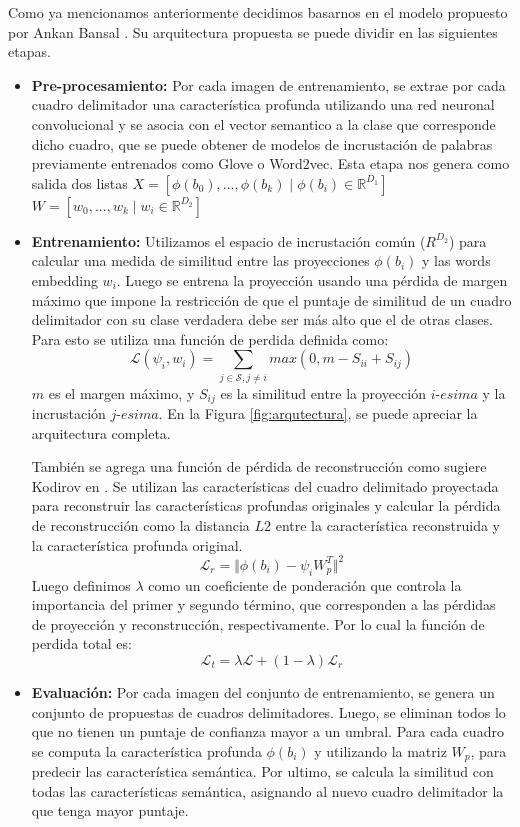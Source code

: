 Como ya mencionamos anteriormente decidimos basarnos en el modelo propuesto por Ankan Bansal \cite{bansal2018zero}. Su arquitectura propuesta se puede dividir en las siguientes etapas.
\begin{itemize}
	\item \textbf{Pre-procesamiento:} Por cada imagen de entrenamiento, se extrae por cada cuadro delimitador una característica profunda utilizando una red neuronal convolucional y se asocia con el vector semantico a la clase que corresponde dicho cuadro, que se puede obtener de modelos de incrustación de palabras previamente entrenados como Glove o Word2vec. Esta etapa nos genera como salida dos listas $X = [\phi(b_0),...,\phi(b_k) \mid \phi(b_i) \in \mathbb{R}^{D_1}]$ $W = [w_0,...,w_k \mid w_i \in \mathbb{R}^{D_2}]$
	\item \textbf{Entrenamiento:} Utilizamos el espacio de incrustación común (${R}^{D_2}$) para calcular una medida de similitud entre las proyecciones  $\phi(b_i)$ y las words embedding $w_i$. Luego se entrena la proyección usando una pérdida de margen máximo que impone la restricción de que el puntaje de similitud de un cuadro delimitador con su clase verdadera debe ser más alto que el de otras clases. Para esto se utiliza una función de perdida definida como: \[\mathcal{L}(\psi_i, w_i) = \sum_{j \in \mathcal{S}, j\neq i} max(0, m - S_{ii} + S_{ij})\] $m$ es el margen máximo, y $S_{ij}$ es la similitud entre la proyección $i$-$esima$ y la incrustación $j$-$esima$. En la Figura \ref{fig:arqutectura}, se puede apreciar la arquitectura completa.
	 
	 También se agrega una función de pérdida de reconstrucción como sugiere Kodirov en \cite{kodirov2017semantic}. Se utilizan las características del cuadro delimitado proyectada para reconstruir las características profundas originales y calcular la pérdida de reconstrucción como la distancia $L2$  entre la característica reconstruida y la característica profunda original. \[\mathcal{L}_r = \Vert{\phi(b_i) - \psi_iW_p^T}\Vert^2 \] Luego definimos $\lambda$ como un coeficiente de ponderación que controla la importancia del primer y segundo término, que corresponden a las pérdidas de proyección y reconstrucción, respectivamente. Por lo cual la función de perdida total es: \[\mathcal{L}_t = \lambda \mathcal{L} + (1-\lambda) \mathcal{L}_r \]
	\item \textbf{Evaluación:} Por cada imagen del conjunto de entrenamiento, se genera un conjunto de propuestas de cuadros delimitadores. Luego, se eliminan todos lo que no tienen un puntaje de confianza mayor a un umbral. Para cada cuadro se computa la característica profunda $\phi(b_i)$ y utilizando la matriz $W_p$, para predecir las característica semántica. Por ultimo, se calcula la similitud con todas las características semántica, asignando al nuevo cuadro delimitador la que tenga mayor puntaje.
\end{itemize}

